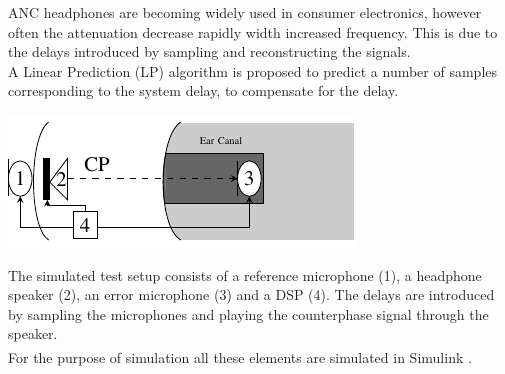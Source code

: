 ANC headphones are becoming widely used in consumer electronics, however often the attenuation decrease rapidly width increased frequency. This is due to the delays introduced by sampling and reconstructing the signals. \\
A Linear Prediction (LP) algorithm is proposed to predict a number of samples corresponding to the system delay, to compensate for the delay.   
\begin{centering}
	\includegraphics[width=\textwidth]{figures/BasicOverviewZoomed.pdf}
\end{centering}
The simulated test setup consists of a reference microphone (1), a headphone speaker (2), an error microphone (3) and a DSP (4). The delays are introduced by sampling the microphones and playing the counterphase signal through the speaker.\\  For the purpose of simulation all these elements are simulated in Simulink\textsuperscript{\textregistered} .
